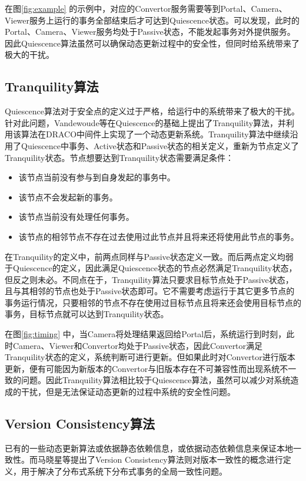 \documentclass[macfonts,master]{njuthesis}
\begin{document}
在图\ref{fig:example} 的示例中，对应的Convertor服务需要等到Portal、Camera、Viewer服务上运行的事务全部结束后才可达到Quiescence状态。可以发现，此时的Portal、Camera、Viewer服务均处于Passive状态，不能发起事务对外提供服务。因此Quiescence算法虽然可以确保动态更新过程中的安全性，但同时给系统带来了极大的干扰\cite{arnold1996software}。

\subsection{Tranquility算法}
Quiescence算法对于安全点的定义过于严格，给运行中的系统带来了极大的干扰。针对此问题，Vandewoude等在Quiescence的基础上提出了Tranquility算法\cite{vandewoude2007tranquility}，并利用该算法在DRACO\cite{vandewoude2003draco}中间件上实现了一个动态更新系统。Tranquility算法中继续沿用了Quiescence中事务、Active状态和Passive状态的相关定义，重新为节点定义了Tranquility状态。节点想要达到Tranquility状态需要满足条件：

\begin{itemize}
	\item 该节点当前没有参与到自身发起的事务中。
	\item 该节点不会发起新的事务。
	\item 该节点当前没有处理任何事务。
	\item 该节点的相邻节点不存在过去使用过此节点并且将来还将使用此节点的事务。
\end{itemize}

在Tranquility的定义中，前两点同样与Passive状态定义一致。而后两点定义均弱于Quiescence的定义，因此满足Quiescence状态的节点必然满足Tranquility状态，但反之则未必。不同点在于，Tranquility算法只要求目标节点处于Passive状态，且与其相邻的节点也处于Passive状态即可。它不需要考虑运行于其它更多节点的事务运行情况，只要相邻的节点不存在使用过目标节点且将来还会使用目标节点的事务，目标节点就可以达到Tranquility状态。

在图\ref{fig:timing} 中，当Camera将处理结果返回给Portal后，系统运行到时刻，此时Camera、Viewer和Convertor均处于Passive状态，因此Convertor满足Tranquility状态的定义，系统判断可进行更新。但如果此时对Convertor进行版本更新，便有可能因为新版本的Convertor与旧版本存在不可兼容性而出现系统不一致的问题。因此Tranquility算法相比较于Quiescence算法，虽然可以减少对系统造成的干扰，但是无法保证动态更新的过程中系统的安全性问题。

\subsection{Version Consistency算法}
已有的一些动态更新算法或依据静态依赖信息\cite{kramer1990evolving}，或依据动态依赖信息\cite{vandewoude2007tranquility,bidan1998dynamic,chen2002component}来保证本地一致性。而马晓星等提出了Version Consistency算法\cite{ma2011version}则对版本一致性的概念进行定义，用于解决了分布式系统下分布式事务的全局一致性问题。
\end{document}
